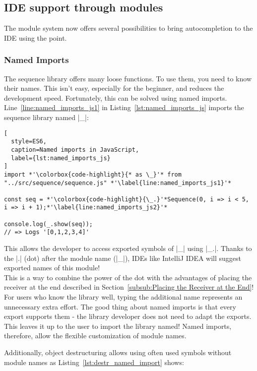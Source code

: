 \subsection{IDE support through modules} %
\label{sub:IDE support through modules}
The module system now offers several possibilities to bring autocompletion to
the IDE using the point.
\subsubsection{Named Imports} %
\label{sec:Named Imports}
The sequence library offers many loose functions. To use them, you need to know
their names. This isn't easy, especially for the beginner, and reduces the
development speed. Fortunately, this can be solved using named imports.
Line~\ref{line:named_imports_js1} in Listing~\ref{lst:named_imports_js} imports
the sequence library named |_|:

\begin{lstlisting}[
  style=ES6,
  caption=Named imports in JavaScript,
  label={lst:named_imports_js}
]
import *'\colorbox{code-highlight}{* as \_}'* from "../src/sequence/sequence.js" *'\label{line:named_imports_js1}'*

const seq = *'\colorbox{code-highlight}{\_.}'*Sequence(0, i => i < 5, i => i + 1);*'\label{line:named_imports_js2}'*

console.log(_.show(seq));
// => Logs '[0,1,2,3,4]'
\end{lstlisting}
This allows the developer to access exported symbols of |_| using |_.|. Thanks
to the |.| (dot) after the module name (|_|), IDEs like IntelliJ IDEA will
suggest exported names of this module!\\
This is a way to combine the power of the dot with the advantages of placing
the receiver at the end described in Section~\ref{subsub:Placing the Receiver
at the End}! \\
For users who know the library well, typing the additional name represents an
unnecessary extra effort. The good thing about named imports is that every
export supports them - the library developer does not need to adapt the
exports. \\
This leaves it up to the user to import the library named! Named
imports, therefore, allow the flexible customization of module names.

Additionally, object destructuring allows using often used symbols without
module names as Listing~\ref{lst:destr_named_import} shows:

